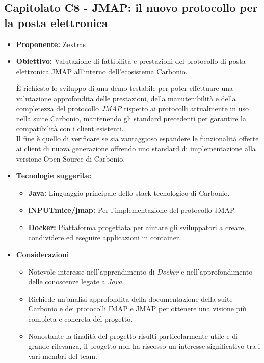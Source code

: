 \documentclass{article}
\begin{document}
\subsection{\textbf{Capitolato C8} - JMAP: il nuovo protocollo per la posta elettronica}
\begin{itemize}
    \item[] \textbf{Proponente:} Zextras
    
    \item[] \textbf{Obiettivo:} Valutazione di fattibilità e prestazioni del protocollo di posta elettronica JMAP all'interno dell'ecosistema Carbonio.
    
    È richiesto lo sviluppo di una demo testabile per poter effettuare una valutazione approfondita delle prestazioni, della manutenibilità e della completezza del protocollo \textit{JMAP} rispetto ai protocolli attualmente in uso nella suite Carbonio, mantenendo gli standard precedenti per garantire la compatibilità con i client esistenti. \\
    Il fine è quello di verificare se sia vantaggioso espandere le funzionalità offerte ai client di nuova generazione offrendo uno standard di implementazione alla versione Open Source di Carbonio.
    
    \item[] \textbf{Tecnologie suggerite:} 
    \begin{itemize}
        \item \textbf{Java:} Linguaggio principale dello stack tecnologico di Carbonio.
        \item \textbf{iNPUTmice/jmap:} Per l’implementazione del protocollo JMAP.
        \item \textbf{Docker:} Piattaforma progettata per aiutare gli sviluppatori a creare, condividere ed eseguire applicazioni in container.
    \end{itemize}
    
    \item[] \textbf{Considerazioni}
    \begin{itemize}
        \item Notevole interesse nell'apprendimento di \textit{Docker} e nell'approfondimento delle conoscenze legate a \textit{Java}.
        \item Richiede un'analisi approfondita della documentazione della suite Carbonio e dei protocolli IMAP e JMAP per ottenere una visione più completa e concreta del progetto.
        \item Nonostante la finalità del progetto risulti particolarmente utile e di grande rilevanza, il progetto non ha riscosso un interesse significativo tra i vari membri del team.
    \end{itemize} 

\end{itemize}
\pagebreak
\end{document}

